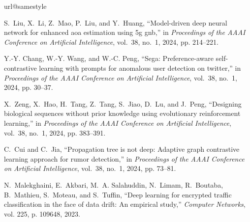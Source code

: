 \documentclass[conference,compsoc]{IEEEtran} %
\begin{document}
		
\begin{thebibliography}{10}
\providecommand{\url}[1]{#1}
\csname url@samestyle\endcsname
\providecommand{\newblock}{\relax}
\providecommand{\bibinfo}[2]{#2}
\providecommand{\BIBentrySTDinterwordspacing}{\spaceskip=0pt\relax}
\providecommand{\BIBentryALTinterwordstretchfactor}{4}
\providecommand{\BIBentryALTinterwordspacing}{\spaceskip=\fontdimen2\font plus
\BIBentryALTinterwordstretchfactor\fontdimen3\font minus
  \fontdimen4\font\relax}
\providecommand{\BIBforeignlanguage}[2]{{%
\expandafter\ifx\csname l@#1\endcsname\relax
\typeout{** WARNING: IEEEtran.bst: No hyphenation pattern has been}%
\typeout{** loaded for the language `#1'. Using the pattern for}%
\typeout{** the default language instead.}%
\else
\language=\csname l@#1\endcsname
\fi
#2}}
\providecommand{\BIBdecl}{\relax}
\BIBdecl

S.~Liu, X.~Li, Z.~Mao, P.~Liu, and Y.~Huang, ``Model-driven deep neural network
  for enhanced aoa estimation using 5g gnb,'' in \emph{Proceedings of the AAAI
  Conference on Artificial Intelligence}, vol.~38, no.~1, 2024, pp. 214--221.

Y.-Y. Chang, W.-Y. Wang, and W.-C. Peng, ``Sega: Preference-aware
  self-contrastive learning with prompts for anomalous user detection on
  twitter,'' in \emph{Proceedings of the AAAI Conference on Artificial
  Intelligence}, vol.~38, no.~1, 2024, pp. 30--37.

X.~Zeng, X.~Hao, H.~Tang, Z.~Tang, S.~Jiao, D.~Lu, and J.~Peng, ``Designing
  biological sequences without prior knowledge using evolutionary reinforcement
  learning,'' in \emph{Proceedings of the AAAI Conference on Artificial
  Intelligence}, vol.~38, no.~1, 2024, pp. 383--391.

C.~Cui and C.~Jia, ``Propagation tree is not deep: Adaptive graph contrastive
  learning approach for rumor detection,'' in \emph{Proceedings of the AAAI
  Conference on Artificial Intelligence}, vol.~38, no.~1, 2024, pp. 73--81.

N.~Malekghaini, E.~Akbari, M.~A. Salahuddin, N.~Limam, R.~Boutaba, B.~Mathieu,
  S.~Moteau, and S.~Tuffin, ``Deep learning for encrypted traffic
  classification in the face of data drift: An empirical study,''
  \emph{Computer Networks}, vol. 225, p. 109648, 2023.


\end{thebibliography}
\end{document}
